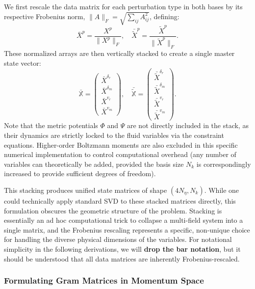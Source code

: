 \begin{subappendices}
We first rescale the data matrix for each perturbation type in both bases by its respective Frobenius norm, $\|A\|_F = \sqrt{\sum_{ij} A_{ij}^2}$, defining:
\begin{equation}
\bar{X}^p = \frac{X^p}{\|X^p\|_F},\quad \bar{\tilde X}^p = \frac{\tilde X^p}{\|\tilde X^p\|_F}.
\end{equation}
These normalized arrays are then vertically stacked to create a single master state vector:
\begin{equation}
\mathbb{{\bar X}} = \begin{pmatrix}
\bar{X}^{\delta_r} \\
\bar{X}^{\delta_m} \\
\bar{X}^{v_r} \\
\bar{X}^{v_m}
\end{pmatrix}, \quad \mathbb{{\bar {\tilde X}}} = \begin{pmatrix}
\bar{\tilde X}^{\delta_r} \\
\bar{\tilde X}^{\delta_m} \\
\bar{\tilde X}^{v_r} \\
\bar{\tilde X}^{v_m}
\end{pmatrix}.
\end{equation}
Note that the metric potentials $\Phi$ and $\Psi$ are not directly included in the stack, as their dynamics are strictly locked to the fluid variables via the constraint equations. Higher-order Boltzmann moments are also excluded in this specific numerical implementation to control computational overhead (any number of variables can theoretically be added, provided the basis size $N_k$ is correspondingly increased to provide sufficient degrees of freedom). 

This stacking produces unified state matrices of shape $(4N_\eta, N_k)$. While one could technically apply standard SVD to these stacked matrices directly, this formulation obscures the geometric structure of the problem. Stacking is essentially an ad hoc computational trick to collapse a multi-field system into a single matrix, and the Frobenius rescaling represents a specific, non-unique choice for handling the diverse physical dimensions of the variables. For notational simplicity in the following derivations, we will \textbf{drop the bar notation}, but it should be understood that all data matrices are inherently Frobenius-rescaled.

\subsubsection{Formulating Gram Matrices in Momentum Space }


\end{subappendices}
